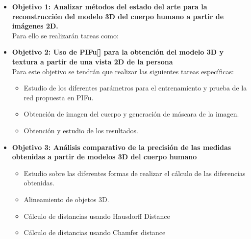 


\begin{itemize}
	\item{\textbf{Objetivo 1: Analizar métodos del estado del arte para la reconstrucción del modelo 3D del cuerpo humano a partir de imágenes 2D.}} 
	\\Para ello se realizarán tareas como:

	\item{\textbf{Objetivo 2: Uso de PIFu[\cite{pifu}] para la obtención del modelo 3D y textura a partir de una vista 2D de la persona  }} \\
	Para este objetivo se tendrán que realizar las siguientes tareas específicas:
	\begin{itemize}
		\item Estudio de los diferentes parámetros para el entrenamiento y prueba de la red propuesta en PIFu.
		\item Obtención de imagen del cuerpo y generación de máscara de la imagen.
		\item Obtención y estudio de los resultados.
		
	\end{itemize}

	\item{\textbf{Objetivo 3: Análisis comparativo de la precisión de las medidas obtenidas a partir de modelos 3D del cuerpo humano }} \\
	\begin{itemize}
		\item Estudio sobre las diferentes formas de realizar el cálculo de las diferencias obtenidas.
		\item Alineamiento de objetos 3D.
		\item Cálculo de distancias usando Hausdorff Distance
		\item Cálculo de distancias usando Chamfer distance
	\end{itemize}
\end{itemize}

\label{sec:Introducción}

